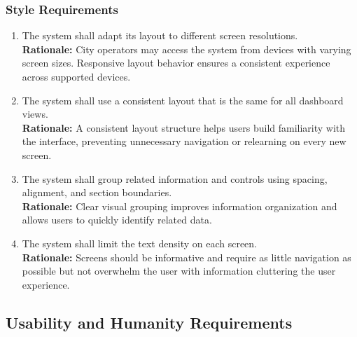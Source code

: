 \documentclass[]{article}
\begin{document}
\subsubsection{Style Requirements}
\label{ssub:style_requirements}
\begin{enumerate}[{LF-S}1. ]
	\item The system shall adapt its layout to different screen resolutions.\\
	\textbf{Rationale:} City operators may access the system from devices with varying screen sizes. Responsive layout behavior ensures a consistent experience across supported devices.
	\item The system shall use a consistent layout that is the same for all dashboard views.\\
	\textbf{Rationale:} A consistent layout structure helps users build familiarity with the interface, preventing unnecessary navigation or relearning on every new screen.
	\item The system shall group related information and controls using spacing, alignment, and section boundaries.\\
	\textbf{Rationale:} Clear visual grouping improves information organization and allows users to quickly identify related data.
	\item The system shall limit the text density on each screen.\\
	\textbf{Rationale:} Screens should be informative and require as little navigation as possible but not overwhelm the user with information cluttering the user experience.
\end{enumerate}



\subsection{Usability and Humanity Requirements}
\label{sub:usability_and_humanity_requirements}
\end{document}
